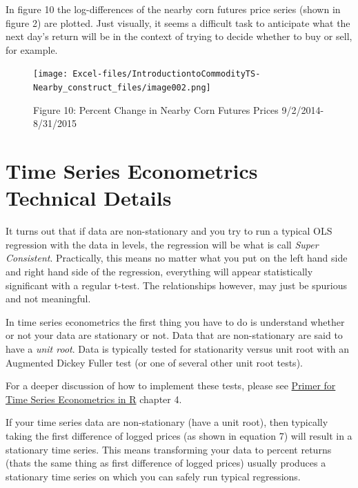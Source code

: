 \documentclass[
  letterpaper,
  DIV=11,
  numbers=noendperiod]{scrreprt}
\begin{document}
In figure 10 the log-differences of the nearby corn futures price series
(shown in figure 2) are plotted. Just visually, it seems a difficult
task to anticipate what the next day's return will be in the context of
trying to decide whether to buy or sell, for example.

\begin{figure}

{\centering \texttt{[image: Excel-files/IntroductiontoCommodityTS-Nearby\_construct\_files/image002.png]}

}

\caption{Figure 10: Percent Change in Nearby Corn Futures Prices
9/2/2014-8/31/2015}

\end{figure}

\hypertarget{time-series-econometrics-technical-details}{%
\section{Time Series Econometrics Technical
Details}\label{time-series-econometrics-technical-details}}

It turns out that if data are non-stationary and you try to run a
typical OLS regression with the data in levels, the regression will be
what is call \emph{Super Consistent}. Practically, this means no matter
what you put on the left hand side and right hand side of the
regression, everything will appear statistically significant with a
regular t-test. The relationships however, may just be spurious and not
meaningful.

In time series econometrics the first thing you have to do is understand
whether or not your data are stationary or not. Data that are
non-stationary are said to have a \emph{unit root}. Data is typically
tested for stationarity versus unit root with an Augmented Dickey Fuller
test (or one of several other unit root tests).

For a deeper discussion of how to implement these tests, please see
\href{http://mindymallory.com/R-Companion-Price-Analysis/}{Primer for
Time Series Econometrics in R} chapter 4.

If your time series data are non-stationary (have a unit root), then
typically taking the first difference of logged prices (as shown in
equation 7) will result in a stationary time series. This means
transforming your data to percent returns (thats the same thing as first
difference of logged prices) usually produces a stationary time series
on which you can safely run typical regressions.
\end{document}
